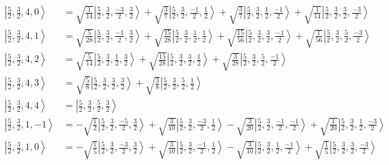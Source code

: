 \documentclass{report}
\newcommand{\ket}[1]{\left| #1 \right>} %
\begin{document}
\begin{align*}
\ket{ \frac{5}{2} ,  \frac{3}{2} ,  4 ,  0  } &=  \sqrt{  \frac{1}{14}  } \ket{ \frac{5}{2} ,  \frac{3}{2} ,  \frac{-3}{2} ,  \frac{3}{2}  } + \sqrt{  \frac{3}{7}  } \ket{ \frac{5}{2} ,  \frac{3}{2} ,  \frac{-1}{2} ,  \frac{1}{2}  } + \sqrt{  \frac{3}{7}  } \ket{ \frac{5}{2} ,  \frac{3}{2} ,  \frac{1}{2} ,  \frac{-1}{2}  } + \sqrt{  \frac{1}{14}  } \ket{ \frac{5}{2} ,  \frac{3}{2} ,  \frac{3}{2} ,  \frac{-3}{2}  } \\
\ket{ \frac{5}{2} ,  \frac{3}{2} ,  4 ,  1  } &=  \sqrt{  \frac{5}{28}  } \ket{ \frac{5}{2} ,  \frac{3}{2} ,  \frac{-1}{2} ,  \frac{3}{2}  } + \sqrt{  \frac{15}{28}  } \ket{ \frac{5}{2} ,  \frac{3}{2} ,  \frac{1}{2} ,  \frac{1}{2}  } + \sqrt{  \frac{15}{56}  } \ket{ \frac{5}{2} ,  \frac{3}{2} ,  \frac{3}{2} ,  \frac{-1}{2}  } + \sqrt{  \frac{1}{56}  } \ket{ \frac{5}{2} ,  \frac{3}{2} ,  \frac{5}{2} ,  \frac{-3}{2}  } \\
\ket{ \frac{5}{2} ,  \frac{3}{2} ,  4 ,  2  } &=  \sqrt{  \frac{5}{14}  } \ket{ \frac{5}{2} ,  \frac{3}{2} ,  \frac{1}{2} ,  \frac{3}{2}  } + \sqrt{  \frac{15}{28}  } \ket{ \frac{5}{2} ,  \frac{3}{2} ,  \frac{3}{2} ,  \frac{1}{2}  } + \sqrt{  \frac{3}{28}  } \ket{ \frac{5}{2} ,  \frac{3}{2} ,  \frac{5}{2} ,  \frac{-1}{2}  } \\
\ket{ \frac{5}{2} ,  \frac{3}{2} ,  4 ,  3  } &=  \sqrt{  \frac{5}{8}  } \ket{ \frac{5}{2} ,  \frac{3}{2} ,  \frac{3}{2} ,  \frac{3}{2}  } + \sqrt{  \frac{3}{8}  } \ket{ \frac{5}{2} ,  \frac{3}{2} ,  \frac{5}{2} ,  \frac{1}{2}  } \\
\ket{ \frac{5}{2} ,  \frac{3}{2} ,  4 ,  4  } &=  \ket{ \frac{5}{2} ,  \frac{3}{2} ,  \frac{5}{2} ,  \frac{3}{2}  } \\
\ket{ \frac{5}{2} ,  \frac{3}{2} ,  1 ,  -1  } &=  - \sqrt{  \frac{1}{2}  } \ket{ \frac{5}{2} ,  \frac{3}{2} ,  \frac{-5}{2} ,  \frac{3}{2}  } + \sqrt{  \frac{3}{10}  } \ket{ \frac{5}{2} ,  \frac{3}{2} ,  \frac{-3}{2} ,  \frac{1}{2}  } - \sqrt{  \frac{3}{20}  } \ket{ \frac{5}{2} ,  \frac{3}{2} ,  \frac{-1}{2} ,  \frac{-1}{2}  } + \sqrt{  \frac{1}{20}  } \ket{ \frac{5}{2} ,  \frac{3}{2} ,  \frac{1}{2} ,  \frac{-3}{2}  } \\
\ket{ \frac{5}{2} ,  \frac{3}{2} ,  1 ,  0  } &=  - \sqrt{  \frac{1}{5}  } \ket{ \frac{5}{2} ,  \frac{3}{2} ,  \frac{-3}{2} ,  \frac{3}{2}  } + \sqrt{  \frac{3}{10}  } \ket{ \frac{5}{2} ,  \frac{3}{2} ,  \frac{-1}{2} ,  \frac{1}{2}  } - \sqrt{  \frac{3}{10}  } \ket{ \frac{5}{2} ,  \frac{3}{2} ,  \frac{1}{2} ,  \frac{-1}{2}  } + \sqrt{  \frac{1}{5}  } \ket{ \frac{5}{2} ,  \frac{3}{2} ,  \frac{3}{2} ,  \frac{-3}{2}  } \\

\end{align*}
\end{document}
